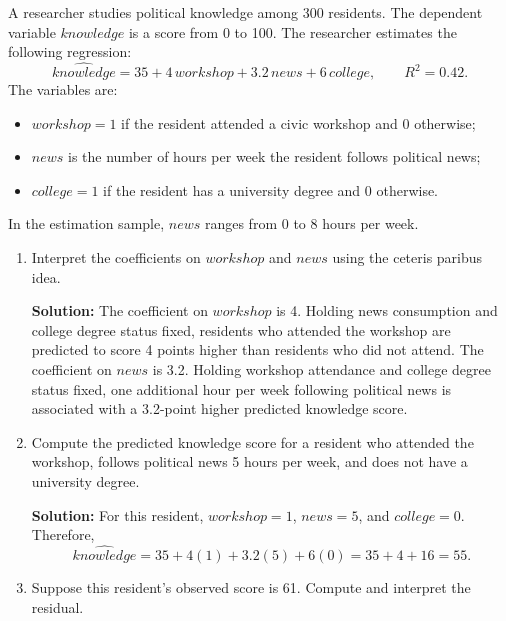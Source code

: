 \documentclass[11pt]{exam}
\begin{document}
\begin{questions}
\newpage
\question[2.5]
A researcher studies political knowledge among 300 residents. The dependent variable $knowledge$ is a score from 0 to 100. The researcher estimates the following regression:
\[
\widehat{knowledge}=35+4\,workshop+3.2\,news+6\,college,\qquad R^2=0.42.
\]
The variables are:
\begin{itemize}[leftmargin = 0.6cm]
    \item $workshop=1$ if the resident attended a civic workshop and $0$ otherwise;
    \item $news$ is the number of hours per week the resident follows political news;
    \item $college=1$ if the resident has a university degree and $0$ otherwise.
\end{itemize}
In the estimation sample, $news$ ranges from 0 to 8 hours per week.

\begin{enumerate}[leftmargin = 0.5cm, label = (\alph*), rightmargin = 0.2cm]
    \item Interpret the coefficients on $workshop$ and $news$ using the ceteris paribus idea.

    \begin{solutionorbox}[6.6cm]
    \textbf{Solution:} The coefficient on $workshop$ is 4. Holding news consumption and college degree status fixed, residents who attended the workshop are predicted to score 4 points higher than residents who did not attend. The coefficient on $news$ is 3.2. Holding workshop attendance and college degree status fixed, one additional hour per week following political news is associated with a 3.2-point higher predicted knowledge score.
    \end{solutionorbox}

    \item Compute the predicted knowledge score for a resident who attended the workshop, follows political news 5 hours per week, and does not have a university degree.

    \begin{solutionorbox}[5.2cm]
    \textbf{Solution:} For this resident, $workshop=1$, $news=5$, and $college=0$. Therefore,
    \[
    \widehat{knowledge}=35+4(1)+3.2(5)+6(0)=35+4+16=55.
    \]
    \end{solutionorbox}

    \item Suppose this resident's observed score is 61. Compute and interpret the residual.


\end{enumerate}
\end{questions}
\end{document}
